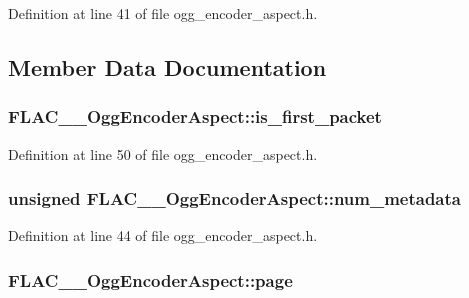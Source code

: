 Definition at line 41 of file ogg\+\_\+encoder\+\_\+aspect.\+h.



\subsection{Member Data Documentation}
\subsubsection[{\texorpdfstring{is\+\_\+first\+\_\+packet}{is_first_packet}}]{ F\+L\+A\+C\+\_\+\+\_\+\+Ogg\+Encoder\+Aspect\+::is\+\_\+first\+\_\+packet}\hypertarget{struct_f_l_a_c_____ogg_encoder_aspect_a6ada35274f264bd7721dcebc39da1d05}{}\label{struct_f_l_a_c_____ogg_encoder_aspect_a6ada35274f264bd7721dcebc39da1d05}


Definition at line 50 of file ogg\+\_\+encoder\+\_\+aspect.\+h.

\subsubsection[{\texorpdfstring{num\+\_\+metadata}{num_metadata}}]{\setlength{\rightskip}{0pt plus 5cm}unsigned F\+L\+A\+C\+\_\+\+\_\+\+Ogg\+Encoder\+Aspect\+::num\+\_\+metadata}\hypertarget{struct_f_l_a_c_____ogg_encoder_aspect_a5badb1285a2ad175eb0756c859d83b82}{}\label{struct_f_l_a_c_____ogg_encoder_aspect_a5badb1285a2ad175eb0756c859d83b82}


Definition at line 44 of file ogg\+\_\+encoder\+\_\+aspect.\+h.

\subsubsection[{\texorpdfstring{page}{page}}]{ F\+L\+A\+C\+\_\+\+\_\+\+Ogg\+Encoder\+Aspect\+::page}\hypertarget{struct_f_l_a_c_____ogg_encoder_aspect_aba765d0dd53b767f2f633c871ba73276}{}\label{struct_f_l_a_c_____ogg_encoder_aspect_aba765d0dd53b767f2f633c871ba73276}


